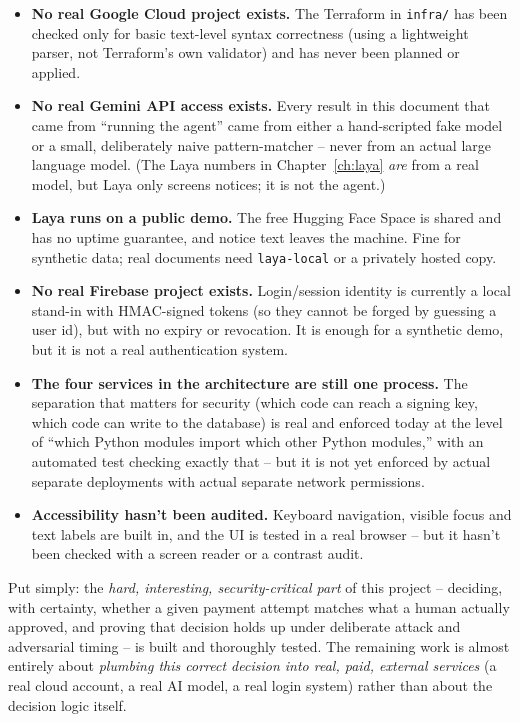 \documentclass[11pt]{report}
\newcommand{\file}[1]{\texttt{#1}}
\newcommand{\code}[1]{\texttt{#1}}
\begin{document}
\begin{itemize}[leftmargin=2em]
\item \textbf{No real Google Cloud project exists.} The Terraform in
      \file{infra/} has been checked only for basic text-level syntax
      correctness (using a lightweight parser, not Terraform's own
      validator) and has never been planned or applied.
\item \textbf{No real Gemini API access exists.} Every result in this
      document that came from ``running the agent'' came from either a
      hand-scripted fake model or a small, deliberately naive
      pattern-matcher -- never from an actual large language model. (The
      Laya numbers in Chapter~\ref{ch:laya} \emph{are} from a real
      model, but Laya only screens notices; it is not the agent.)
\item \textbf{Laya runs on a public demo.} The free Hugging Face Space is
      shared and has no uptime guarantee, and notice text leaves the
      machine. Fine for synthetic data; real documents need
      \code{laya-local} or a privately hosted copy.
\item \textbf{No real Firebase project exists.} Login/session identity is
      currently a local stand-in with HMAC-signed tokens (so they cannot
      be forged by guessing a user id), but with no expiry or revocation.
      It is enough for a synthetic demo, but it is not a real
      authentication system.
\item \textbf{The four services in the architecture are still one
      process.} The separation that matters for security (which code
      can reach a signing key, which code can write to the database) is
      real and enforced today at the level of ``which Python modules
      import which other Python modules,'' with an automated test
      checking exactly that -- but it is not yet enforced by actual
      separate deployments with actual separate network permissions.
\item \textbf{Accessibility hasn't been audited.} Keyboard navigation,
      visible focus and text labels are built in, and the UI is tested in
      a real browser -- but it hasn't been checked with a screen reader or
      a contrast audit.
\end{itemize}

Put simply: the \emph{hard, interesting, security-critical part} of this
project -- deciding, with certainty, whether a given payment attempt
matches what a human actually approved, and proving that decision holds
up under deliberate attack and adversarial timing -- is built and
thoroughly tested. The remaining work is almost entirely about
\emph{plumbing this correct decision into real, paid, external services}
(a real cloud account, a real AI model, a real login system) rather than
about the decision logic itself.
\end{document}
